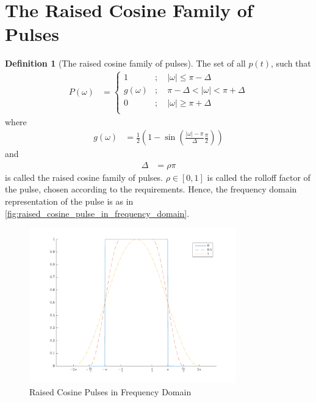 \documentclass[titlepage, fleqn, a4paper, 12pt, twoside]{article}
\theoremstyle{definition}
\newtheorem{definition}{Definition}
\theoremstyle{theorem}
\begin{document}
\section{The Raised Cosine Family of Pulses}

\begin{definition}[The raised cosine family of pulses]
	The set of all $p(t)$, such that
	\begin{align*}
		P(\omega) &=
			\begin{cases}
				1 &;\quad |\omega| \le \pi - \Delta\\
				g(\omega) &;\quad \pi - \Delta < |\omega| < \pi + \Delta\\
				0 &;\quad |\omega| \ge \pi + \Delta\\
			\end{cases}
	\end{align*}
	where
	\begin{align*}
		g(\omega) &= \frac{1}{2} \left( 1 - \sin\left( \frac{|\omega| - \pi}{\Delta} \frac{\pi}{2} \right) \right)
	\end{align*}
	and
	\begin{align*}
		\Delta &= \rho \pi
	\end{align*}
	is called the raised cosine family of pulses.
	$\rho \in [0,1]$ is called the rolloff factor of the pulse, chosen according to the requirements.
	Hence, the frequency domain representation of the pulse is as in \cref{fig:raised_cosine_pulse_in_frequency_domain}.
	\begin{figure}[H]
		\centering
		\includegraphics[width = 0.8\textwidth]{./Plots/raised_cosine_pulses_in_frequency.pdf}
		\caption{Raised Cosine Pulses in Frequency Domain}
		\label{fig:raised_cosine_pulses_in_frequency_domain}
	\end{figure}
\end{definition}
\end{document}
